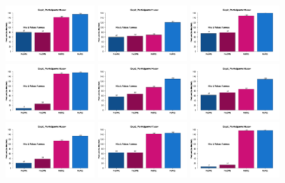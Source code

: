 \begin{figure}[th]
\includegraphics[width=0.30\textwidth]{Figures/MirrorRate_Exp2_P10} \includegraphics[width=0.30\textwidth]{Figures/MirrorRate_Exp2_P11} \includegraphics[width=0.30\textwidth]{Figures/MirrorRate_Exp2_P12}
\includegraphics[width=0.30\textwidth]{Figures/MirrorRate_Exp2_P13} \includegraphics[width=0.30\textwidth]{Figures/MirrorRate_Exp2_P14} \includegraphics[width=0.30\textwidth]{Figures/MirrorRate_Exp2_P15}
\includegraphics[width=0.30\textwidth]{Figures/MirrorRate_Exp2_P16} \includegraphics[width=0.30\textwidth]{Figures/MirrorRate_Exp2_P17} \includegraphics[width=0.30\textwidth]{Figures/MirrorRate_Exp2_P18}

\end{figure}
